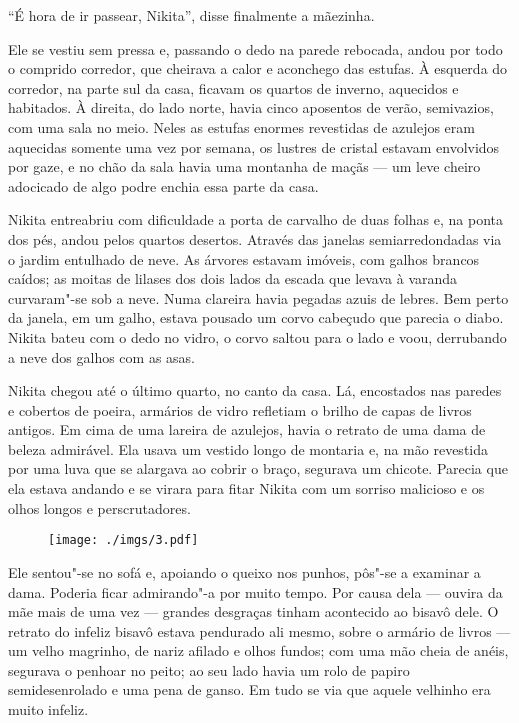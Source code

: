 ``É hora de ir passear, Nikita'', disse finalmente a mãezinha.

Ele se vestiu sem pressa e, passando o dedo na parede rebocada, andou
por todo o comprido corredor, que cheirava a calor e aconchego das
estufas. À esquerda do corredor, na parte sul da casa, ficavam os
quartos de inverno, aquecidos e habitados. À direita, do lado norte,
havia cinco aposentos de verão, semivazios, com uma sala no meio. Neles
as estufas enormes revestidas de azulejos eram aquecidas somente uma vez
por semana, os lustres de cristal estavam envolvidos por gaze, e no chão
da sala havia uma montanha de maçãs --- um leve cheiro adocicado de algo
podre enchia essa parte da casa.

Nikita entreabriu com dificuldade a porta de carvalho de duas folhas e,
na ponta dos pés, andou pelos quartos desertos. Através das janelas
semiarredondadas via o jardim entulhado de neve. As árvores estavam
imóveis, com galhos brancos caídos; as moitas de lilases dos dois lados
da escada que levava à varanda curvaram"-se sob a neve. Numa clareira
havia pegadas azuis de lebres. Bem perto da janela, em um galho, estava
pousado um corvo cabeçudo que parecia o diabo. Nikita bateu com o dedo
no vidro, o corvo saltou para o lado e voou, derrubando a neve dos
galhos com as asas.

Nikita chegou até o último quarto, no canto da casa. Lá, encostados nas
paredes e cobertos de poeira, armários de vidro refletiam o
brilho de capas de livros antigos. Em cima de uma lareira de
azulejos, havia o retrato de uma dama de beleza admirável. Ela usava
um vestido longo de montaria e, na mão revestida por uma luva que se
alargava ao cobrir o braço, segurava um chicote. Parecia que ela estava
andando e se virara para fitar Nikita com um sorriso malicioso e os
olhos longos e perscrutadores.

\begin{figure}
\vspace*{-2.65cm}
\hspace*{-2.85cm}\texttt{[image: ./imgs/3.pdf]}
\end{figure}

Ele sentou"-se no sofá e, apoiando o queixo nos punhos, pôs"-se a examinar
a dama. Poderia ficar admirando"-a por muito tempo. Por causa dela ---
ouvira da mãe mais de uma vez --- grandes desgraças tinham acontecido ao
bisavô dele. O retrato do infeliz bisavô estava pendurado ali mesmo,
sobre o armário de livros --- um velho magrinho, de nariz afilado e
olhos fundos; com uma mão cheia de anéis, segurava o penhoar no peito;
ao seu lado havia um rolo de papiro semidesenrolado e uma pena de ganso.
Em tudo se via que aquele velhinho era muito infeliz.


